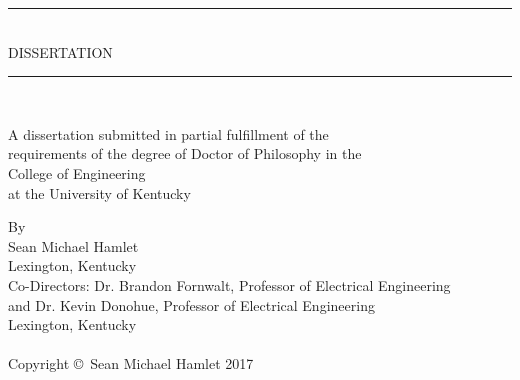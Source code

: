 

\begin{titlepage}
\begin{center}
	
	\makeatletter
	\@title
	\makeatother
	
	\vspace{0.75in}
	
	\rule{3.5in}{0.5pt}\\ %
	\bigskip
	DISSERTATION\\
	\smallskip
	\rule{3.5in}{0.5pt}\\ %
	
	\bigskip
	
	A dissertation submitted in partial fulfillment of the\\
	requirements of the degree of Doctor of Philosophy in the\\
	College of Engineering\\
	at the University of Kentucky
	
	\bigskip
	\bigskip
	
	By \\
	\bigskip
	Sean Michael Hamlet\\
	\bigskip
	Lexington, Kentucky\\
	\bigskip
	Co-Directors: Dr. Brandon Fornwalt, Professor of Electrical Engineering\\
	and Dr. Kevin Donohue, Professor of Electrical Engineering\\
	\bigskip
	Lexington, Kentucky\\
	\\
	\bigskip
	Copyright \copyright\ Sean Michael Hamlet 2017
\end{center}
\end{titlepage}

\restoregeometry